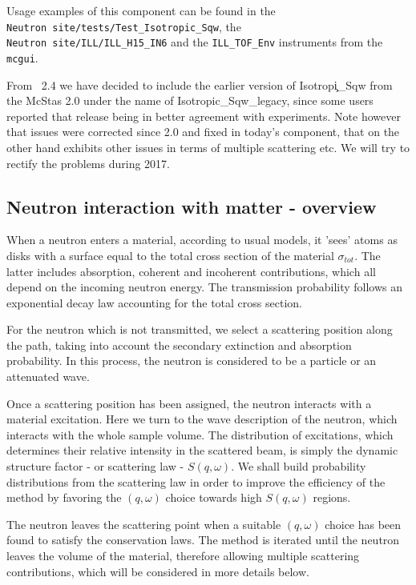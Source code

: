 Usage examples of this component can be found in the \\
\verb+Neutron site/tests/Test_Isotropic_Sqw+, the \\
\verb+Neutron site/ILL/ILL_H15_IN6+ and the \verb+ILL_TOF_Env+ instruments from the \verb+mcgui+.

From \MCS\ 2.4 we have decided to include the earlier version of Isotropi\c_Sqw from the McStas 2.0 under the name of Isotropic\_Sqw\_legacy, since some users reported that release being in better agreement with experiments. 
Note however that issues were corrected since 2.0 and fixed in today's component, that on the other hand exhibits other issues in terms of multiple scattering etc. We will try to rectify the problems during 2017.

\subsection{Neutron interaction with matter - overview}

When a neutron enters a material, according to usual models, it 'sees' atoms as disks with a surface equal to the total cross section of the material $\sigma_{tot}$. The latter includes absorption, coherent and incoherent contributions, which all depend on the incoming neutron energy.
The transmission probability follows an exponential decay law accounting for the total cross section.

For the neutron which is not transmitted, we select a scattering position along the path, taking into account the secondary extinction and absorption probability. In this process, the neutron is considered to be a particle or an attenuated wave.

Once a scattering position has been assigned, the neutron interacts with a material excitation. Here we turn to the wave description of the neutron, which interacts with the whole sample volume. The distribution of excitations, which determines their relative intensity in the scattered beam, is simply the dynamic structure factor - or scattering law - $S(q,\omega)$. We shall build probability distributions from the scattering law in order to improve the efficiency of the method by favoring the $(q,\omega)$ choice towards high $S(q,\omega)$ regions.

The neutron leaves the scattering point when a suitable $(q, \omega)$ choice has been found to satisfy the conservation laws. The method is iterated until the neutron leaves the volume of the material, therefore allowing multiple scattering contributions, which will be considered in more details below.


